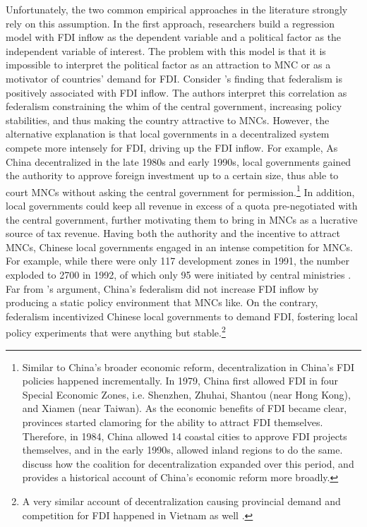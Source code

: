 Unfortunately, the two common empirical approaches in the literature strongly
rely on this
assumption. In the first approach, researchers build a regression model with FDI
inflow as the dependent variable and a political factor as the independent
variable of interest. The problem with this model is that it is impossible to
interpret the political factor as an attraction to MNC or as a motivator of
countries' demand for FDI. Consider \citet{Jensen2005}'s finding that federalism
is positively associated with FDI inflow. The authors interpret this correlation
as federalism constraining the whim of the central government, increasing policy
stabilities, and thus making the country attractive to MNCs. However, the
alternative explanation is that local governments in a decentralized system
compete more intensely for FDI, driving up the FDI inflow. For example, As China
decentralized in the late 1980s and early 1990s, local governments gained the
authority to approve foreign investment up to a certain size, thus able to court
MNCs without asking the central government for permission.\footnote{Similar to
  China's broader economic reform, decentralization in China's FDI policies
  happened incrementally. In 1979, China first allowed FDI in four Special
  Economic Zones, i.e. Shenzhen, Zhuhai, Shantou (near Hong Kong), and Xiamen
  (near Taiwan). As the economic benefits of FDI became clear, provinces started
  clamoring for the ability to attract FDI themselves. Therefore, in 1984, China
  allowed 14 coastal cities to approve FDI projects themselves, and in the early
  1990s, allowed inland regions to do the same. \citet{Gallagher2002, Shirk1993}
  discuss how the coalition for decentralization expanded over this period, and
  \citet{Coase2012} provides a historical account of China's economic reform
  more broadly.} In addition, local governments could keep all revenue in excess
of a quota pre-negotiated with the central government, further motivating them
to bring in MNCs as a lucrative source of tax revenue. Having both the authority
and the incentive to attract MNCs, Chinese local governments engaged in an
intense competition for MNCs. For example, while there were only 117 development
zones in 1991, the number exploded to 2700 in 1992, of which only 95 were
initiated by central ministries \citep{Montinola1995}. Far from
\citet{Jensen2005}'s argument, China's federalism did not increase FDI inflow by
producing a static policy environment that MNCs like. On the contrary,
federalism incentivized Chinese local governments to demand FDI, fostering local
policy experiments that were anything but stable.\footnote{A very similar
  account of decentralization causing provincial demand and competition for FDI
  happened in Vietnam as well \citep{Malesky2004c}.}

